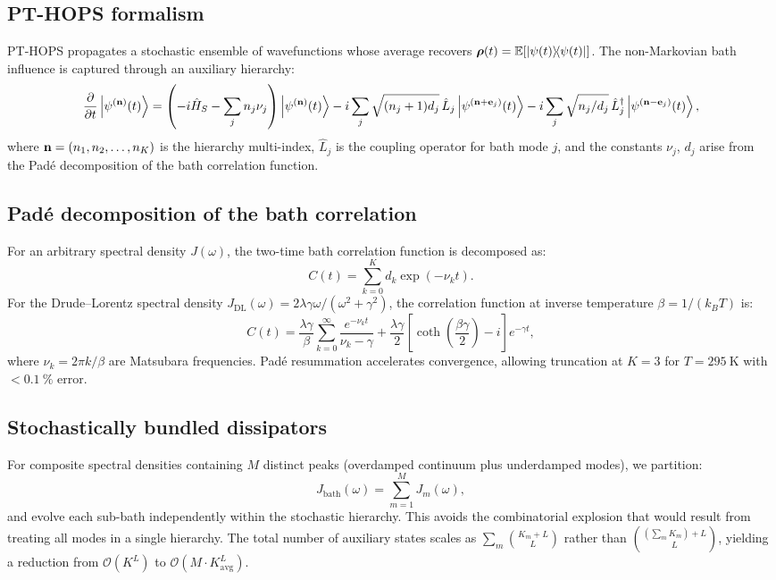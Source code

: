 \documentclass[journal=jctc,manuscript=article]{achemso}
\begin{document}
\subsection{PT-HOPS formalism}
PT-HOPS propagates a stochastic ensemble of wavefunctions whose average recovers $\vb*{\rho}(t) = \mathbb{E}[\dyad{\psi(t)}]$. The non-Markovian bath influence is captured through an auxiliary hierarchy:\cite{Suess2014,Citty2024a}
\begin{equation}
\pdv{t}\ket{\psi^{(\vb{n})}(t)} = \left(-i\hat{H}_S - \sum_{j} n_j \nu_j\right)\ket{\psi^{(\vb{n})}(t)}
- i\sum_{j} \sqrt{(n_j+1)d_j}\, \hat{L}_j \ket{\psi^{(\vb{n}+\vb{e}_j)}(t)}
- i\sum_{j} \sqrt{n_j/d_j}\, \hat{L}_j^\dagger \ket{\psi^{(\vb{n}-\vb{e}_j)}(t)},
\label{eq:hops}
\end{equation}
where $\vb{n} = (n_1, n_2, \ldots, n_K)$ is the hierarchy multi-index, $\hat{L}_j$ is the coupling operator for bath mode $j$, and the constants $\nu_j$, $d_j$ arise from the Padé decomposition of the bath correlation function.\cite{Duan2017}

\subsection{Padé decomposition of the bath correlation}
For an arbitrary spectral density $J(\omega)$, the two-time bath correlation function is decomposed as:
\begin{equation}
C(t) = \sum_{k=0}^{K} d_k \exp(-\nu_k t).
\label{eq:bath_correlation}
\end{equation}
For the Drude--Lorentz spectral density $J_{\mathrm{DL}}(\omega) = 2\lambda\gamma\omega/(\omega^2 + \gamma^2)$, the correlation function at inverse temperature $\beta = 1/(k_B T)$ is:\cite{Tanimura1989}
\begin{equation}
C(t) = \frac{\lambda\gamma}{\beta}\sum_{k=0}^{\infty} \frac{e^{-\nu_k t}}{\nu_k - \gamma} + \frac{\lambda\gamma}{2}\left[\coth\!\left(\frac{\beta\gamma}{2}\right) - i\right]e^{-\gamma t},
\label{eq:correlation_DL}
\end{equation}
where $\nu_k = 2\pi k/\beta$ are Matsubara frequencies. Padé resummation accelerates convergence, allowing truncation at $K = 3$ for $T = \SI{295}{\kelvin}$ with $< \SI{0.1}{\percent}$ error.

\subsection{Stochastically bundled dissipators}
For composite spectral densities containing $M$ distinct peaks (overdamped continuum plus underdamped modes), we partition:\cite{Citty2024a}
\begin{equation}
J_{\mathrm{bath}}(\omega) = \sum_{m=1}^{M} J_m(\omega),
\label{eq:sbd}
\end{equation}
and evolve each sub-bath independently within the stochastic hierarchy. This avoids the combinatorial explosion that would result from treating all modes in a single hierarchy. The total number of auxiliary states scales as $\sum_m \binom{K_m + L}{L}$ rather than $\binom{(\sum_m K_m) + L}{L}$, yielding a reduction from $\mathcal{O}(K^L)$ to $\mathcal{O}(M \cdot K_{\mathrm{avg}}^L)$.
\end{document}
